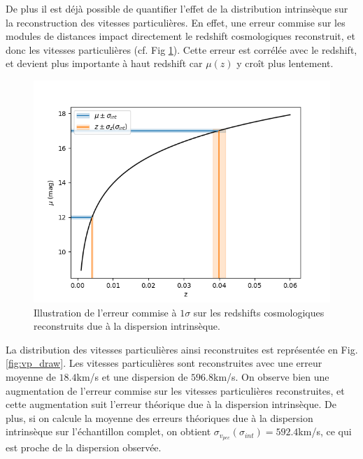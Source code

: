 \documentclass{book}
\begin{document}
De plus il est déjà possible de quantifier l'effet de la distribution intrinsèque sur la reconstruction des vitesses particulières. En effet, une erreur commise sur les modules de distances impact directement le redshift cosmologiques reconstruit, et donc les vitesses particulières (cf. Fig \ref{fig:vp_sigma_int}). Cette erreur est corrélée avec le redshift, et devient plus importante à haut redshift car $\mu(z)$ y croît plus lentement.

\begin{figure}[h]
	\centering
	\includegraphics[width=0.8\linewidth]{figures/sigma_int_effect_vp.png}
	\caption{Illustration de l'erreur commise à $1\sigma$ sur les redshifts cosmologiques reconstruits due à la dispersion intrinsèque.}
	\label{fig:vp_sigma_int}
\end{figure}

La distribution des vitesses particulières ainsi reconstruites est représentée en Fig. \ref{fig:vp_draw}. Les vitesses particulières sont reconstruites avec une erreur moyenne de $18.4$km/s et une dispersion de $596.8$km/s. On observe bien une augmentation de l'erreur commise sur les vitesses particulières reconstruites, et cette augmentation suit l'erreur théorique due à la dispersion intrinsèque. De plus, si on calcule la moyenne des erreurs théoriques due à la dispersion intrinsèque sur l'échantillon complet, on obtient $\sigma_{v_{pec}}(\sigma_{int}) = 592.4$km/s, ce qui est proche de la dispersion observée.
\end{document}

